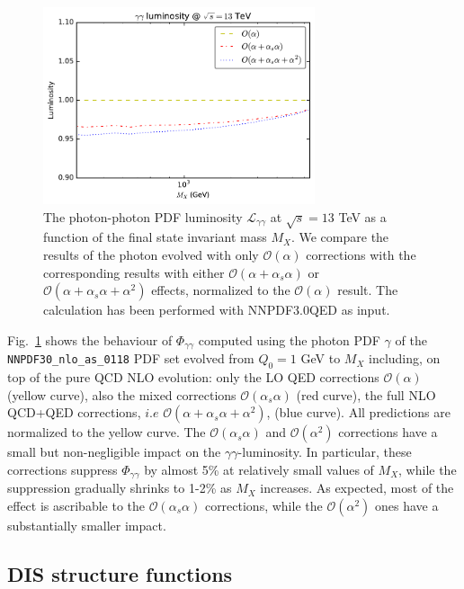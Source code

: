 \begin{figure}[t]
\includegraphics[width=8cm]{figs/lumi_13tev.pdf} 
\caption{The photon-photon
PDF luminosity $\mathcal{L}_{\gamma\gamma}$ at $\sqrt{s} = 13$ TeV as a
  function of the final state invariant mass $M_X$.
  We compare the results of the photon evolved
  with only $\mathcal{O}(\alpha)$ corrections
  with the corresponding results with either
  $\mathcal{O}(\alpha+\alpha_s\alpha)$
  or $\mathcal{O}(\alpha+\alpha_s\alpha+\alpha^2)$ effects,
  normalized to the $\mathcal{O}(\alpha)$ result.
  The calculation has been performed with
  NNPDF3.0QED as input.
}
\label{fig:GammaGammaLumi}
\end{figure}

Fig.~\ref{fig:GammaGammaLumi} shows the behaviour of
$\Phi_{\gamma\gamma}$ computed using the photon PDF $\gamma$ of the
{\tt NNPDF30\_nlo\_as\_0118} PDF set evolved from $Q_0 = 1$ GeV to
$M_X$ including, on top of the pure QCD NLO evolution: only the LO QED
corrections $\mathcal{O}(\alpha)$ (yellow curve), also the mixed
corrections $\mathcal{O}(\alpha_s\alpha)$ (red curve), the full NLO
QCD+QED corrections, $i.e$
$\mathcal{O}(\alpha+\alpha_s\alpha+\alpha^2)$, (blue curve). All
predictions are normalized to the yellow curve. The
$\mathcal{O}(\alpha_s\alpha)$ and $\mathcal{O}(\alpha^2)$ corrections
have a small but non-negligible impact on the
$\gamma\gamma$-luminosity. In particular, these corrections suppress
$\Phi_{\gamma\gamma}$ by almost 5\% at relatively small values of
$M_X$, while the suppression gradually shrinks to 1-2\% as $M_X$
increases. As expected, most of the effect is ascribable to the
$\mathcal{O}(\alpha_s\alpha)$ corrections, while the
$\mathcal{O}(\alpha^2)$ ones have a substantially smaller impact.

\subsection{DIS structure functions}

